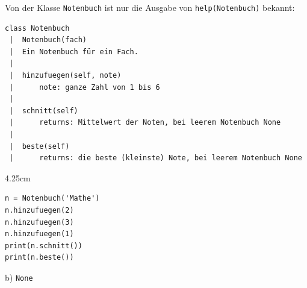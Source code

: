 \question[4]
Von der Klasse \texttt{Notenbuch} ist nur die Ausgabe von \texttt{help(Notenbuch)} bekannt:
\begin{lstlisting}[language={}]
class Notenbuch
 |  Notenbuch(fach)
 |  Ein Notenbuch für ein Fach.
 |
 |  hinzufuegen(self, note)
 |      note: ganze Zahl von 1 bis 6
 |
 |  schnitt(self)
 |      returns: Mittelwert der Noten, bei leerem Notenbuch None
 |
 |  beste(self)
 |      returns: die beste (kleinste) Note, bei leerem Notenbuch None
\end{lstlisting}
\begin{solutionbox}{4.25cm}
\begin{lstlisting}
n = Notenbuch('Mathe')
n.hinzufuegen(2)
n.hinzufuegen(3)
n.hinzufuegen(1)
print(n.schnitt())
print(n.beste())
\end{lstlisting}
b) \texttt{None}
\end{solutionbox}

